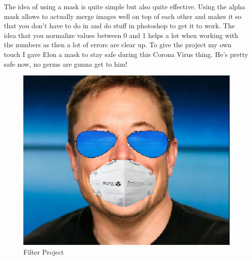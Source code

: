 \documentclass[fleqn]{article}
\begin{document}
      The idea of using a mask is quite simple but also quite effective. Using the alpha mask allows to actually merge images well on top of each other and makes it so that you don't have to do in and do stuff in photoshop to get it to work. The idea that you normalize values between 0 and 1 helps a lot when working with the numbers as then a lot of errors are clear up. To give the project my own touch I gave Elon a mask to stay safe during this Corona Virus thing. He's pretty safe now, no germs are gunna get to him!

      \begin{figure}[h]
        \centering
        \includegraphics[width=340pt]{elonmask.png}
        \caption{Filter Project}
        \label{ElonMask}
      \end{figure}
\end{document}
